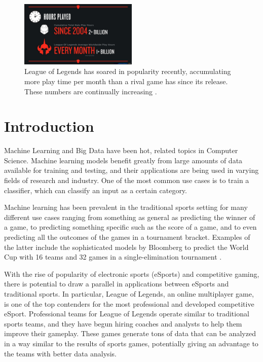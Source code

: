 \begin{figure}[t!]
  \centering
    \includegraphics[width=0.5\textwidth]{increased-gaming}
  \caption{League of Legends has soared in popularity recently, accumulating more play time per month than a rival game has since its release.  These numbers are continually increasing \cite{1_riot_games_2015}.}
  \label{fig:increased-gaming}
\end{figure}

\section{Introduction}
Machine Learning and Big Data have been hot, related topics in Computer Science.
Machine learning models benefit greatly from large amounts of data 
available for training and testing, and their applications are being used in varying fields 
of research and industry.  One of the most common use cases is to train a classifier, which 
can classify an input as a certain category.

Machine learning has been prevalent in the traditional sports setting for many different use 
cases ranging from something as general as predicting the winner of a game, to predicting something 
specific such as the score of a game, and to even predicting all the outcomes of the games in a 
tournament bracket.  Examples of the latter include the sophisticated models by Bloomberg to predict 
the World Cup with 16 teams and 32 games in a single-elimination tournament \cite{4_bloomberg_2015}.  

With the rise of popularity of electronic sports (eSports) and competitive gaming, 
there is potential to draw a parallel in applications between eSports and traditional sports.  
In particular, League of Legends, an online multiplayer game, is one of the top contenders for 
the most professional and developed competitive eSport.  Professional teams for League of Legends 
operate similar to traditional sports teams, and they have begun hiring coaches and analysts to 
help them improve their gameplay.
These games generate tons of data that can be analyzed in a way 
similar to the results of sports games, potentially giving an advantage to the teams 
with better data analysis. 

